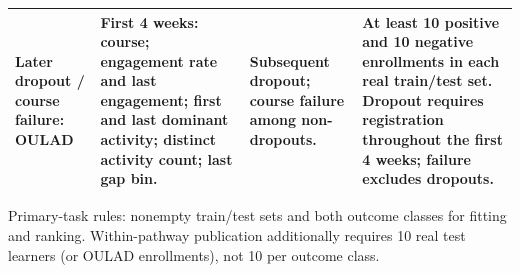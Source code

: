 \begin{table}[!htbp]
\begin{tabularx}{\linewidth}{@{}>{\raggedright\arraybackslash}p{2.15cm}>{\raggedright\arraybackslash}X>{\raggedright\arraybackslash}p{2.85cm}>{\raggedright\arraybackslash}p{3.8cm}@{}}
\addlinespace
Later dropout / course failure: OULAD & First 4 weeks: course; engagement rate and last engagement; first and last dominant activity; distinct activity count; last gap bin. & Subsequent dropout; course failure among non-dropouts. & At least 10 positive and 10 negative enrollments in each real train/test set. Dropout requires registration throughout the first 4 weeks; failure excludes dropouts. \\
\bottomrule
\end{tabularx}
\par\smallskip\raggedright
Primary-task rules: nonempty train/test sets and both outcome classes for fitting and ranking. Within-pathway publication additionally requires 10 real test learners (or OULAD enrollments), not 10 per outcome class.
\end{table}
